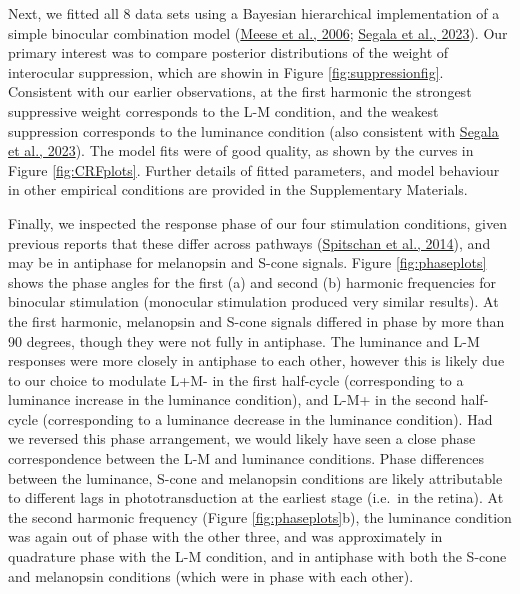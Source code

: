 \documentclass[
]{article}
\begin{document}
Next, we fitted all 8 data sets using a Bayesian hierarchical implementation of a simple binocular combination model (\protect\hyperlink{ref-Meese2006}{Meese et al., 2006}; \protect\hyperlink{ref-Segala2023}{Segala et al., 2023}). Our primary interest was to compare posterior distributions of the weight of interocular suppression, which are showin in Figure \ref{fig:suppressionfig}. Consistent with our earlier observations, at the first harmonic the strongest suppressive weight corresponds to the L-M condition, and the weakest suppression corresponds to the luminance condition (also consistent with \protect\hyperlink{ref-Segala2023}{Segala et al., 2023}). The model fits were of good quality, as shown by the curves in Figure \ref{fig:CRFplots}. Further details of fitted parameters, and model behaviour in other empirical conditions are provided in the Supplementary Materials.

Finally, we inspected the response phase of our four stimulation conditions, given previous reports that these differ across pathways (\protect\hyperlink{ref-Spitschan2014}{Spitschan et al., 2014}), and may be in antiphase for melanopsin and S-cone signals. Figure \ref{fig:phaseplots} shows the phase angles for the first (a) and second (b) harmonic frequencies for binocular stimulation (monocular stimulation produced very similar results). At the first harmonic, melanopsin and S-cone signals differed in phase by more than 90 degrees, though they were not fully in antiphase. The luminance and L-M responses were more closely in antiphase to each other, however this is likely due to our choice to modulate L+M- in the first half-cycle (corresponding to a luminance increase in the luminance condition), and L-M+ in the second half-cycle (corresponding to a luminance decrease in the luminance condition). Had we reversed this phase arrangement, we would likely have seen a close phase correspondence between the L-M and luminance conditions. Phase differences between the luminance, S-cone and melanopsin conditions are likely attributable to different lags in phototransduction at the earliest stage (i.e.~in the retina). At the second harmonic frequency (Figure \ref{fig:phaseplots}b), the luminance condition was again out of phase with the other three, and was approximately in quadrature phase with the L-M condition, and in antiphase with both the S-cone and melanopsin conditions (which were in phase with each other).
\end{document}
